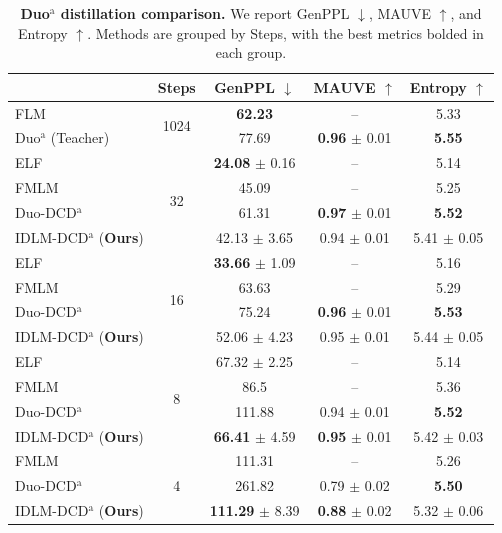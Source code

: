 \begin{table}[t]
    \caption{\textbf{Duo$^{\mathrm{a}}$ distillation comparison.} We report GenPPL $\downarrow$, MAUVE $\uparrow$, and Entropy $\uparrow$. Methods are grouped by Steps, with the best metrics bolded in each group.}
    \label{tab:uniform-ancestral-expanded}
    \centering
    \footnotesize
    \setlength{\tabcolsep}{5pt}
    \begin{tabular}{lcccc}
        \toprule
         & {\scriptsize Steps} & {\scriptsize GenPPL $\downarrow$} & {\scriptsize MAUVE $\uparrow$} & {\scriptsize Entropy $\uparrow$} \\
        \midrule
        FLM~\citep{lee2026flow} & \multirow{2}{*}{1024} & \textbf{62.23} & -- & 5.33 \\
        Duo$^{\mathrm{a}}$ (Teacher)~\citep{sahoo2025the} & & 77.69 & \textbf{0.96} $\pm$ 0.01 & \textbf{5.55} \\
        \midrule
        ELF~\citep{hu2026elf} & \multirow{4}{*}{32} & \textbf{24.08} $\pm$ 0.16 & -- & 5.14 \\
        FMLM~\citep{lee2026flow} & & 45.09 & -- & 5.25 \\
        Duo-DCD$^{\mathrm{a}}$~\citep{sahoo2025the} & & 61.31 & \textbf{0.97} $\pm$ 0.01 & \textbf{5.52} \\
        IDLM-DCD$^{\mathrm{a}}$ (\textbf{Ours}) & & 42.13 $\pm$ 3.65 & 0.94 $\pm$ 0.01 & 5.41 $\pm$ 0.05 \\
        \midrule
        ELF~\citep{hu2026elf} & \multirow{4}{*}{16} & \textbf{33.66} $\pm$ 1.09 & -- & 5.16 \\
        FMLM~\citep{lee2026flow} & & 63.63 & -- & 5.29 \\
        Duo-DCD$^{\mathrm{a}}$~\citep{sahoo2025the} & & 75.24 & \textbf{0.96} $\pm$ 0.01 & \textbf{5.53} \\
        IDLM-DCD$^{\mathrm{a}}$ (\textbf{Ours}) & & 52.06 $\pm$ 4.23 & 0.95 $\pm$ 0.01 & 5.44 $\pm$ 0.05 \\
        \midrule
        ELF~\citep{hu2026elf} & \multirow{4}{*}{8} & 67.32 $\pm$ 2.25 & -- & 5.14 \\
        FMLM~\citep{lee2026flow} & & 86.5 & -- & 5.36 \\
        Duo-DCD$^{\mathrm{a}}$~\citep{sahoo2025the} & & 111.88 & 0.94 $\pm$ 0.01 & \textbf{5.52} \\
        IDLM-DCD$^{\mathrm{a}}$ (\textbf{Ours}) & & \textbf{66.41} $\pm$ 4.59 & \textbf{0.95} $\pm$ 0.01 & 5.42 $\pm$ 0.03 \\
        \midrule
        FMLM~\citep{lee2026flow} & \multirow{3}{*}{4} & 111.31 & -- & 5.26 \\
        Duo-DCD$^{\mathrm{a}}$~\citep{sahoo2025the} & & 261.82 & 0.79 $\pm$ 0.02 & \textbf{5.50} \\
        IDLM-DCD$^{\mathrm{a}}$ (\textbf{Ours}) & & \textbf{111.29} $\pm$ 8.39 & \textbf{0.88} $\pm$ 0.02 & 5.32 $\pm$ 0.06 \\
        \bottomrule
    \end{tabular}
\end{table}

